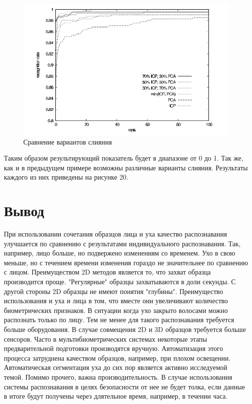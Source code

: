 \documentclass[12pt,a4paper]{article}					%
\begin{document}
\begin{figure}[h!]
\centering
\includegraphics[scale=0.60]{res/fusion_rates}
\caption{Сравнение вариантов слияния}
\end{figure}

Таким образом результирующий показатель будет в диапазоне от 0 до 1.
Так же, как и в предыдущем примере возможны различные варианты слияния. 
Результаты каждого из них приведены на рисунке 20.


\section{Вывод}

При использовании сочетания образцов лица и уха качество распознавания улучшается по сравнению с результатами индивидуального распознавания.
Так, например, лицо больше, но подвержено изменениям со временем. 
Ухо в свою меньше, но с течением времени изменения гораздо не значительнее по сравнению с лицом.
Преимуществом 2D методов является то, что захват образца производится проще.
"Регулярные" образцы захватываются в доли секунды.
С другой стороны 2D образцы не имеют понятия "глубины".
Преимущество использования и уха и лица в том, что вместе они увеличивают количество биометрических признаков.
В ситуации когда ухо закрыто волосами можно распознать только по лицу.
Тем не менее для такого распознавания требуется больше оборудования.
В случае совмещения 2D и 3D образцов требуется больше сенсоров.
Часто в мультибиометрических системах некоторые этапы предварительной подготовки производятся вручную.
Автоматизация этого процесса затруднена качеством образцов, например, при плохом освещении.
Автоматическая сегментация уха до сих пор является активно исследуемой темой.
Помимо прочего, важна производительность.
В случае использования системы распознавания в целях безопасности от нее не будет толка, если данные в итоге будут получены через длятельное время, например, в течении часа.
\end{document}
